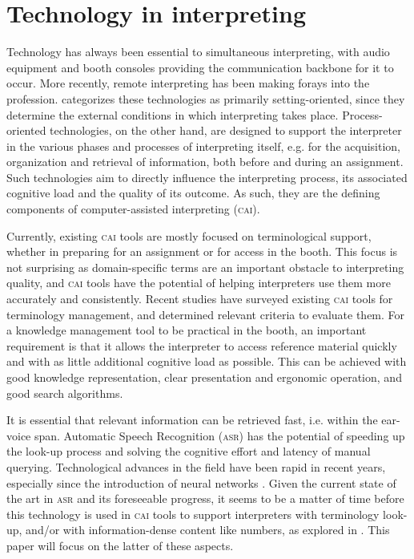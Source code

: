 \documentclass[output=paper]{langsci/langscibook}
\begin{document}
\section{Technology in interpreting}\largerpage[-1]

Technology has always been essential to simultaneous interpreting, with audio equipment and booth consoles providing the communication backbone for it to occur. More recently, remote interpreting has been making forays into the profession. \citet{Fantinuoli2018} categorizes these technologies as primarily setting-ori\-ented, since they determine the external conditions in which interpreting takes place. Process-oriented technologies, on the other hand, are designed to support the interpreter in the various phases and processes of interpreting itself, e.g. for the acquisition, organization and retrieval of information, both before and during an assignment. Such technologies aim to directly influence the interpreting process, its associated cognitive load and the quality of its outcome. As such, they are the defining components of computer-assisted interpreting (\textsc{cai}).

Currently, existing \textsc{cai} tools are mostly focused on terminological support, whether in preparing for an assignment or for access in the booth. This focus is not surprising as domain-specific terms are an important obstacle to interpreting quality, and \textsc{cai} tools have the potential of helping interpreters use them more accurately and consistently. Recent studies \citep{Will2015,Fantinuoli2017a,Costa2018} have surveyed existing \textsc{cai} tools for terminology management, and determined relevant criteria to evaluate them. For a knowledge management tool to be practical in the booth, an important requirement is that it allows the interpreter to access reference material quickly and with as little additional cognitive load as possible. This can be achieved with good knowledge representation, clear presentation and ergonomic operation, and good search algorithms.

It is essential that relevant information can be retrieved fast, i.e. within the ear-voice span. Automatic Speech Recognition (\textsc{asr}) has the potential of speeding up the look-up process and solving the cognitive effort and latency of manual querying. Technological advances in the field have been rapid in recent years, especially since the introduction of neural networks \citep{Yu2016}. Given the current state of the art in \textsc{asr} and its foreseeable progress, it seems to be a matter of time before this technology is used in \textsc{cai} tools to support interpreters with terminology look-up, and/or with information-dense content like numbers, as explored in \citet{Fantinuoli2017b}. This paper will focus on the latter of these aspects. 
\end{document}

